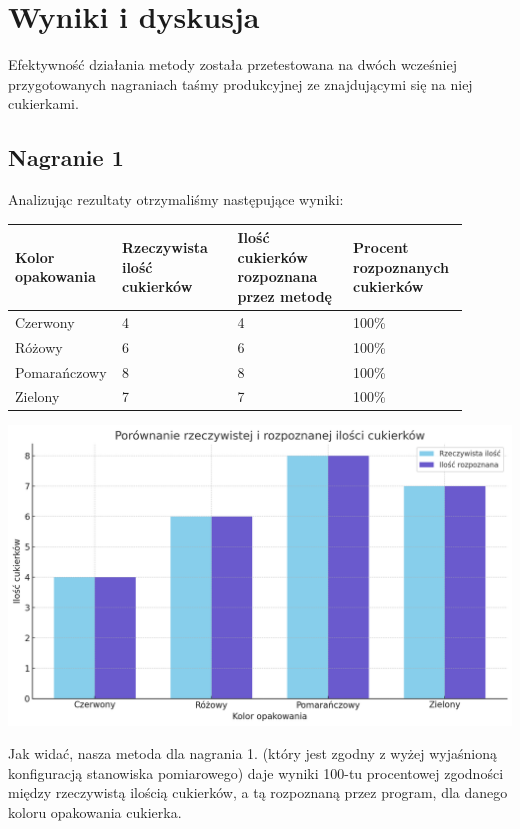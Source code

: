 \documentclass{article}
\begin{document}
\section{Wyniki i dyskusja}
\label{Wyniki i dyskusja}
Efektywność działania metody została przetestowana na dwóch wcześniej przygotowanych nagraniach taśmy produkcyjnej ze znajdującymi się na niej cukierkami.
\subsection{Nagranie 1}
Analizując rezultaty otrzymaliśmy następujące wyniki:

\begin{center}
\begin{tabular}{|p{0.15\linewidth}|p{0.25\linewidth}|p{0.25\linewidth}|p{0.25\linewidth}|}
 \hline
 Kolor opakowania & Rzeczywista ilość cukierków & Ilość cukierków rozpoznana przez metodę & Procent rozpoznanych cukierków \\
 \hline
 Czerwony & 4 & 4 & 100\% \\
 \hline
 Różowy & 6 & 6 & 100\% \\
 \hline
 Pomarańczowy & 8 & 8 & 100\% \\
 \hline
 Zielony & 7 & 7 & 100\% \\
 \hline
\end{tabular}
\end{center}

\begin{center}
\includegraphics[width=\linewidth]{wykres1.png}
\end{center}

Jak widać, nasza metoda dla nagrania 1. (który jest zgodny z wyżej wyjaśnioną konfiguracją stanowiska pomiarowego) daje wyniki 100-tu procentowej zgodności między rzeczywistą ilością cukierków, a tą rozpoznaną przez program, dla danego koloru opakowania cukierka.
\end{document}
